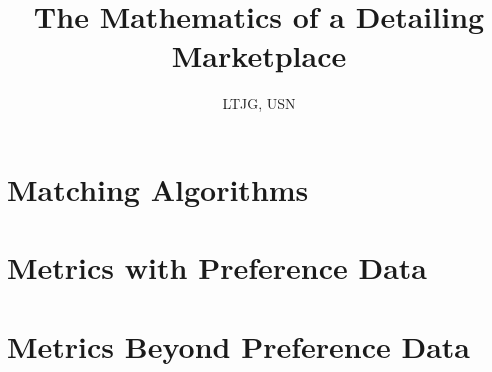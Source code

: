 \documentclass{article}
\title{The Mathematics of a Detailing Marketplace}
\author{\studentname \qquad LTJG, USN}
\begin{document}
\maketitle



\newpage

\tableofcontents

\newpage

\section{Matching Algorithms}







\section{Metrics with Preference Data}









\section{Metrics Beyond Preference Data}







\end{document}
